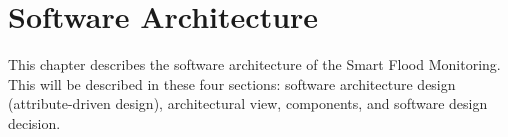 \chapter{Software Architecture}
\label{ch:software}
This chapter describes the software architecture of the Smart Flood Monitoring. This will be described in these four sections: software architecture design (attribute-driven design), architectural view, components, and software design decision.





%



